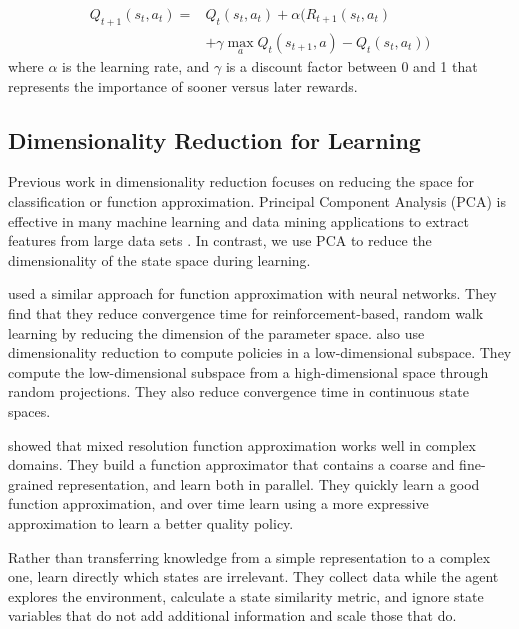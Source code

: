 \documentclass[10pt,a4paper]{article}
\begin{document}
\begin{align}
 Q_{t+1}(s_t, a_t) = & Q_t(s_t, a_t) + \alpha (R_{t+1}(s_t,a_t) \\
& + \gamma \max_aQ_t(s_{t+1},a) - Q_t(s_t, a_t)) \nonumber
\end{align}
where $\alpha$ is the learning rate, and $\gamma$ is a discount factor between 0 and 1 that represents the importance of sooner versus later rewards.

\subsection{Dimensionality Reduction for Learning}
Previous work in dimensionality reduction focuses on reducing the space for classification or function approximation. Principal Component Analysis (PCA) is effective in many machine learning and data mining applications to extract features from large data sets \cite{Pechenizkiy:features,139758}. In contrast, we use PCA to reduce the dimensionality of the state space during learning.

\citeauthor{Swinehart05dimensionalreduction}  used a similar approach for function approximation with neural networks. They find that they reduce convergence time for reinforcement-based, random walk learning by reducing the dimension of the parameter space. \citeauthor{Liu11compressivereinforcement}  also use dimensionality reduction to compute policies in a low-dimensional subspace. They compute the low-dimensional subspace from a high-dimensional space through random projections. They also reduce convergence time in continuous state spaces.

\citeauthor{Grzes::mixed}  showed that mixed resolution function approximation works well in complex domains. They build a function approximator that contains a coarse and fine-grained representation, and learn both in parallel. They quickly learn a good function approximation, and over time learn using a more expressive approximation to learn a better quality policy. 

Rather than transferring knowledge from a simple representation to a complex one, \citeauthor{11AAMAS-MetricLearn-Taylor}  learn directly which states are irrelevant. They collect data while the agent explores the environment, calculate a state similarity metric, and ignore state variables that do not add additional information and scale those that do.
\end{document}
